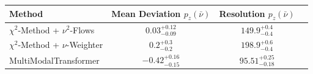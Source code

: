     \begin{tabular}{lccc}
        \toprule
        Method & Mean Deviation $p_{z}(\bar{\nu})$ & Resolution $p_{z}(\bar{\nu})$ \\
        \midrule
        $\chi^2$-Method + $\nu^2$-Flows & $0.03^{+0.12}_{-0.09}$ & $149.9^{+0.4}_{-0.4}$ \\
        $\chi^2$-Method + $\nu$-Weighter & $0.2^{+0.3}_{-0.2}$ & $198.9^{+0.6}_{-0.4}$ \\
        MultiModalTransformer & $-0.42^{+0.16}_{-0.15}$ & $95.51^{+0.25}_{-0.18}$ \\
        \bottomrule
    \end{tabular}
